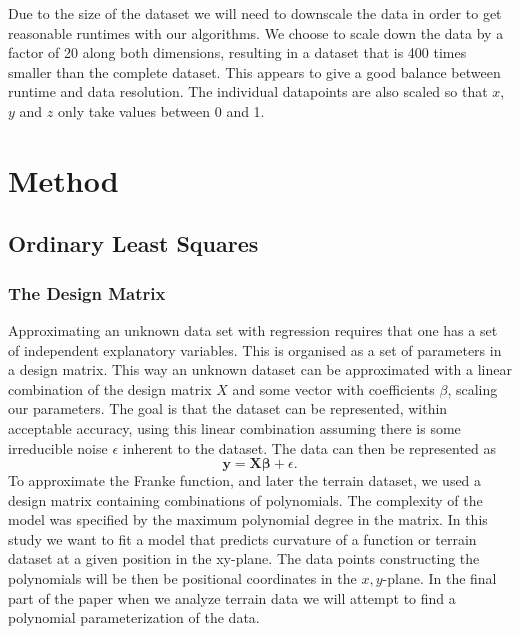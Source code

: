 \documentclass[%
 reprint,
nofootinbib,
 amsmath,amssymb,
 aps,
]{revtex4-2}
\begin{document}
Due to the size of the dataset we will need to downscale the data in order to get reasonable runtimes with our algorithms. We choose to scale down the data by a factor of 20 along both dimensions, resulting in a dataset that is 400 times smaller than the complete dataset. This appears to give a good balance between runtime and data resolution. The individual datapoints are also scaled so that $x$, $y$ and $z$ only take values between 0 and 1.










\section{Method}

\subsection{Ordinary Least Squares}


\subsubsection{The Design Matrix}
%
Approximating an unknown data set with regression requires that one has a set of independent explanatory variables. This is organised as a set of parameters in a design matrix. This way an unknown dataset can be approximated with a linear combination of the design matrix $X$ and some vector with coefficients $\beta$, scaling our parameters. The goal is that the dataset can be represented, within acceptable accuracy, using this linear combination assuming there is some irreducible noise $\epsilon$ inherent to the dataset. The data can then be represented as
%
\begin{equation}\label{eq:datarepresentation}
    \boldsymbol{y} = \boldsymbol{X}\boldsymbol{\beta} + \epsilon.
\end{equation}
%
To approximate the Franke function, and later the terrain dataset, we used a design matrix containing combinations of polynomials. The complexity of the model was specified by the maximum polynomial degree in the matrix. In this study we want to fit a model that predicts curvature of a function or terrain dataset at a given position in the xy-plane. The data points constructing the polynomials will be then be positional coordinates in the $x,y$-plane. In the final part of the paper when we analyze terrain data we will attempt to find a polynomial parameterization of the data.
\end{document}
